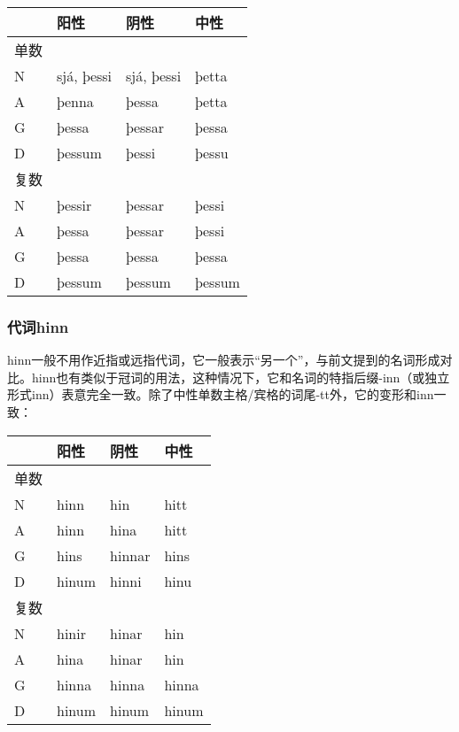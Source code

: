 \begin{introduction}[章节要点]
\begin{longtable}{llll}
    \toprule
         & 阳性       & 阴性       & 中性   \\
    \midrule
    \endhead
    \bottomrule
    \endfoot
    单数 &            &            &        \\
    N    & sjá, þessi & sjá, þessi & þetta  \\
    A    & þenna      & þessa      & þetta  \\
    G    & þessa      & þessar     & þessa  \\
    D    & þessum     & þessi      & þessu  \\
    复数 &            &            &        \\
    N    & þessir     & þessar     & þessi  \\
    A    & þessa      & þessar     & þessi  \\
    G    & þessa      & þessa      & þessa  \\
    D    & þessum     & þessum     & þessum \\
\end{longtable}

\subsubsection{代词hinn}

hinn一般不用作近指或远指代词，它一般表示``另一个''，与前文提到的名词形成对比。hinn也有类似于冠词的用法，这种情况下，它和名词的特指后缀-inn（或独立形式inn）表意完全一致。除了中性单数主格/宾格的词尾-tt外，它的变形和inn一致：

\begin{longtable}{llll}
    \toprule
         & 阳性  & 阴性   & 中性  \\
    \midrule
    \endhead
    \bottomrule
    \endfoot
    单数 &       &        &       \\
    N    & hinn  & hin    & hitt  \\
    A    & hinn  & hina   & hitt  \\
    G    & hins  & hinnar & hins  \\
    D    & hinum & hinni  & hinu  \\
    复数 &       &        &       \\
    N    & hinir & hinar  & hin   \\
    A    & hina  & hinar  & hin   \\
    G    & hinna & hinna  & hinna \\
    D    & hinum & hinum  & hinum \\
\end{longtable}


\end{introduction}
